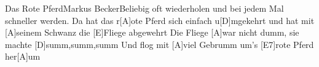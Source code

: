 \documentclass[../main.tex]{subfiles}
\begin{document}
\begin{songwithoutpagebreak}[3]{Das Rote Pferd}{Markus Becker}{Beliebig oft wiederholen und bei jedem Mal schneller werden.}
Da hat das r[A]ote Pferd sich einfach u[D]mgekehrt
und hat mit [A]seinem Schwanz die [E]Fliege abgewehrt
Die Fliege [A]war nicht dumm, sie machte [D]summ,summ,summ
Und flog mit [A]viel Gebrumm um's [E7]rote Pferd her[A]um
\end{songwithoutpagebreak}
\end{document}
